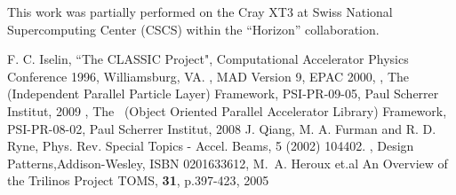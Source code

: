 \documentclass[acus]{JAC2003}
\begin{document}
This work was partially performed on the Cray XT3 at Swiss National Supercomputing Center (CSCS) within the ``Horizon'' collaboration. 
\begin{thebibliography}{9}   %
 {F. C. Iselin}, {``The CLASSIC Project"}, {Computational Accelerator Physics Conference 1996, Williamsburg, VA.}
,{ MAD Version 9}, { EPAC 2000},
, {The \ippl(Independent Parallel Particle Layer) Framework}, PSI-PR-09-05, Paul Scherrer Institut, 2009	
, { The \opal\ (Object Oriented Parallel Accelerator Library) Framework}, PSI-PR-08-02, Paul Scherrer Institut, 2008
 J. Qiang, M. A. Furman and R. D. Ryne, {Phys. Rev. Special Topics - Accel. Beams, 5 (2002) 104402.}
, {Design Patterns},{Addison-Wesley, ISBN {0201633612}},
 {M.~A. Heroux et.al} { An Overview of the {T}rilinos Project}{ TOMS, {\bf 31}}, {p.397-423}, 2005 


\end{thebibliography}
\end{document}
